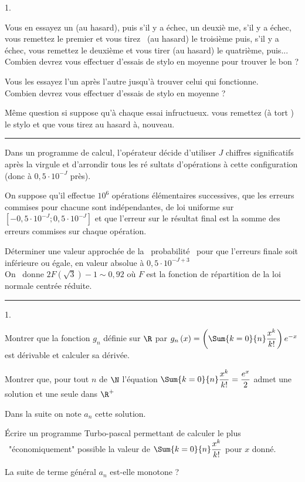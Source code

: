 \documentclass[11pt]{article}%
\begin{document}
\begin{noliste}{1.}
\item Vous en essayez un (au hasard), puis s'il y a échec, un deuxiè%
  me, s'il y a échec, vous remettez le premier et vous tirez \ (au hasard)
  le troisième puis, s'il y a échec, vous remettez le deuxième et
  vous tirer (au hasard) le quatrième, puis...\\
  Combien devrez vous effectuer d'essais de stylo en moyenne pour trouver le
  bon ?

\item Vous les essayez l'un après l'autre jusqu'à trouver celui qui
  fonctionne. \\
  Combien devrez vous effectuer d'essais de stylo en moyenne ?

\item Même question si suppose qu'à chaque essai infructueux. vous
  remettez (à tort ) le stylo et que vous tirez au hasard à, nouveau.
\end{noliste}

\rule{15cm}{0.1cm}

Dans un programme de calcul, l'opérateur décide d'utiliser $J$
chiffres significatifs après la virgule et d'arrondir tous les ré%
sultats d'opérations à cette configuration (donc à $0,5\cdot
10^{-J}$ près).

On suppose qu'il effectue $10^{6}$ opérations élémentaires
successives, que les erreurs commises pour chacune sont indépendantes,
de loi uniforme sur $\left[ -0,5\cdot 10^{-J};0,5\cdot 10^{-J}\right] $ et
que l'erreur sur le résultat final est la somme des erreurs commises sur
chaque opération.

Déterminer une valeur approchée de la \ probabilité \ pour que
l'erreurs finale soit inférieure ou égale, en valeur absolue à $%
0,5\cdot 10^{-J+3}$\\
On \ donne $2F\left( \sqrt{3}\right) -1\sim 0,92$ où $F$ est la
fonction de répartition de la loi normale centrée réduite.




\rule{15cm}{0.1cm}


\begin{noliste}{1.}
\item Montrer que la fonction $g_{n}$ définie sur $\R$ par $%
  g_{n}\left( x\right) =\left( \Sum{k=0}{n}\dfrac{x^{k}}{k!}\right) e^{-x}$
  est dérivable et calculer sa dérivée.

\item Montrer que, pour tout $n$ de $\N$ l'équation $%
  \Sum{k=0}{n}\dfrac{x^{k}}{k!}=\dfrac{e^{x}}{2}\ $admet une solution et une
  seule dans $\R^{+}$

  \hspace{-1cm}Dans la suite on note $a_{n}$ cette solution.

\item Écrire un programme Turbo-pascal permettant de calculer le plus
  \ "économiquement" possible la valeur de
  $\Sum{k=0}{n}\dfrac{x^{k}}{k!}$ pour $x$ donné.

\item La suite de terme général $a_{n}$ est-elle monotone ?
\end{noliste}

\end{document}
